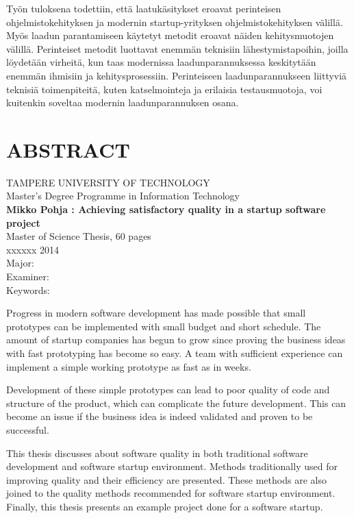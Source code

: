 \noindent
Työn tuloksena todettiin, että laatukäsitykset eroavat perinteisen ohjelmistokehityksen ja modernin startup-yrityksen ohjelmistokehityksen välillä. Myös laadun parantamiseen käytetyt metodit eroavat näiden kehitysmuotojen välillä. Perinteiset metodit luottavat enemmän teknisiin lähestymistapoihin, joilla löydetään virheitä, kun taas modernissa laadunparannuksessa keskitytään enemmän ihmisiin ja kehitysprosessiin. Perinteiseen laadunparannukseen liittyviä teknisiä toimenpiteitä, kuten katselmointeja ja erilaisia testausmuotoja, voi kuitenkin soveltaa modernin laadunparannuksen osana. 

\newpage
\chapter*{ABSTRACT}
\begin{spacing}{1.0}
\textsf{TAMPERE UNIVERSITY OF TECHNOLOGY}\\
\textsf{Master's Degree Programme in Information Technology}\\
{\bf \textsf{Mikko Pohja : Achieving satisfactory quality in a startup software project}}\\
\textsf{Master of Science Thesis, 60 pages}\\
\textsf{xxxxxx 2014}\\
\textsf{Major: }\\
\textsf{Examiner: }\\
\textsf{Keywords: }\\
\end{spacing}
 
\noindent
Progress in modern software development has made possible that small prototypes can be implemented with small budget and short schedule. The amount of startup companies has begun to grow since proving the business ideas with fast prototyping has become so easy. A team with sufficient experience can implement a simple working prototype as fast as in weeks.
 
\noindent
Development of these simple prototypes can lead to poor quality of code and structure of the product, which can complicate the future development. This can become an issue if the business idea is indeed validated and proven to be successful.

\noindent
This thesis discusses about software quality in both traditional software development and software startup environment. Methods traditionally used for improving quality and their efficiency are presented. These methods are also joined to the quality methods recommended for software startup environment. Finally, this thesis presents an example project done for a software startup.

